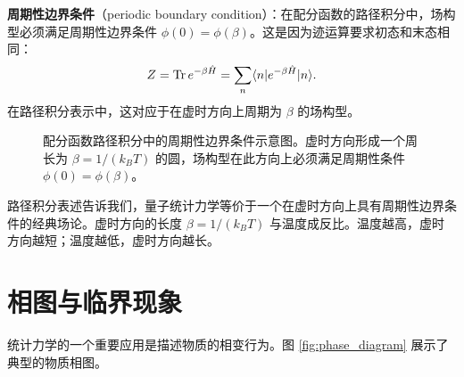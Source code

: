 \begin{definition}[周期性边界条件]
\textbf{周期性边界条件}（periodic boundary condition）：在配分函数的路径积分中，场构型必须满足周期性边界条件 $\phi(0) = \phi(\beta)$。这是因为迹运算要求初态和末态相同：
\begin{equation}
    Z = \Tr e^{-\beta \hat{H}} = \sum_n \langle n | e^{-\beta \hat{H}} | n \rangle.
\end{equation}
在路径积分表示中，这对应于在虚时方向上周期为 $\beta$ 的场构型。
\end{definition}

\begin{figure}[htbp]
\centering
{}
\caption{配分函数路径积分中的周期性边界条件示意图。虚时方向形成一个周长为 $\beta = 1/(k_BT)$ 的圆，场构型在此方向上必须满足周期性条件 $\phi(0) = \phi(\beta)$。}
\label{fig:periodic}
\end{figure}

路径积分表述告诉我们，量子统计力学等价于一个在虚时方向上具有周期性边界条件的经典场论。虚时方向的长度 $\beta = 1/(k_B T)$ 与温度成反比。温度越高，虚时方向越短；温度越低，虚时方向越长。

\section{相图与临界现象}

统计力学的一个重要应用是描述物质的相变行为\cite{Landau1937}。图 \ref{fig:phase_diagram} 展示了典型的物质相图。

